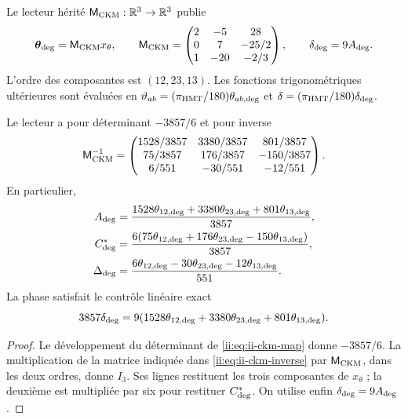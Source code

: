 \begin{definition}
Le lecteur hérité \(\mathsf M_{\rm CKM}:\mathbb R^3\to\mathbb R^3\)
publie
\begin{equation}
 \boldsymbol\theta_{\rm deg}=\mathsf M_{\rm CKM}x_\theta,
 \qquad
 \mathsf M_{\rm CKM}=
 \begin{pmatrix}
 2&-5&28\\
 0&7&-25/2\\
 1&-20&-2/3
 \end{pmatrix},
 \qquad
 \delta_{\rm deg}=9A_{\rm deg}.
 \label{ii:eq:ii-ckm-map}
\end{equation}
L'ordre des composantes est \((12,23,13)\). Les fonctions
trigonométriques ultérieures sont évaluées en
\(\vartheta_{ab}=(\pi_{\rm HMT}/180)\theta_{ab,\rm deg}\) et
\(\delta=(\pi_{\rm HMT}/180)\delta_{\rm deg}\).
\end{definition}

\begin{proposition}
Le lecteur a pour déterminant \(-3857/6\) et pour inverse
\begin{equation}
 \mathsf M_{\rm CKM}^{-1}=
 \begin{pmatrix}
 1528/3857&3380/3857&801/3857\\
 75/3857&176/3857&-150/3857\\
 6/551&-30/551&-12/551
 \end{pmatrix}.
 \label{ii:eq:ii-ckm-inverse}
\end{equation}
En particulier,
\begin{align}
 A_{\rm deg}
 &=\frac{1528\theta_{12,\rm deg}+3380\theta_{23,\rm deg}
          +801\theta_{13,\rm deg}}{3857},\nonumber\\
 C^*_{\rm deg}
 &=\frac{6(75\theta_{12,\rm deg}+176\theta_{23,\rm deg}
          -150\theta_{13,\rm deg})}{3857},\nonumber\\
 \Delta_{\rm deg}
 &=\frac{6\theta_{12,\rm deg}-30\theta_{23,\rm deg}
          -12\theta_{13,\rm deg}}{551}.
 \label{ii:eq:ii-ckm-recover}
\end{align}
La phase satisfait le contrôle linéaire exact
\begin{equation}
 3857\delta_{\rm deg}
 =9(1528\theta_{12,\rm deg}+3380\theta_{23,\rm deg}
      +801\theta_{13,\rm deg}).
 \label{ii:eq:ii-ckm-phase-check}
\end{equation}
\end{proposition}

\begin{proof}
Le développement du déterminant de \eqref{ii:eq:ii-ckm-map} donne
\(-3857/6\). La multiplication de la matrice indiquée dans
\eqref{ii:eq:ii-ckm-inverse} par \(\mathsf M_{\rm CKM}\), dans les deux
ordres, donne \(I_3\). Ses lignes restituent les trois composantes de
\(x_\theta\) ; la deuxième est multipliée par six pour restituer
\(C^*_{\rm deg}\). On utilise enfin
\(\delta_{\rm deg}=9A_{\rm deg}\).
\end{proof}

